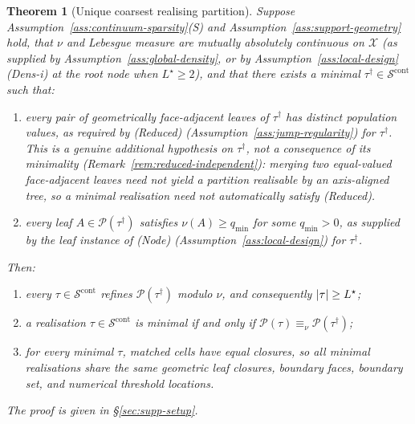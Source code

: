 \documentclass[11pt]{article}
\theoremstyle{plain}
\newtheorem{theorem}{Theorem}[section]
\theoremstyle{definition}
\theoremstyle{remark}
\newcommand{\cX}{\mathcal{X}}
\newcommand{\cS}{\mathcal{S}}
\newcommand{\cP}{\mathcal{P}}
\DeclarePairedDelimiter{\card}{\lvert}{\rvert}
\begin{document}
\begin{theorem}[Unique coarsest realising partition]\label{thm:true-partition}
Suppose Assumption~\ref{ass:continuum-sparsity}(S) and
Assumption~\ref{ass:support-geometry} hold, that \(\nu\) and Lebesgue
measure are mutually absolutely continuous on \(\cX\) (as supplied by
Assumption~\ref{ass:global-density}, or by
Assumption~\ref{ass:local-design}(Dens-i) at the root node when
\(L^\star\ge2\)), and that there exists a minimal
\(\tau^{\dagger}\in\cS^{\mathrm{cont}}\) such that:
\begin{enumerate}[leftmargin=*]
\item every pair of geometrically face-adjacent leaves of \(\tau^{\dagger}\)
has distinct population values, as required by (Reduced)
(Assumption~\ref{ass:jump-regularity}) for \(\tau^{\dagger}\). This is a
genuine additional hypothesis on \(\tau^{\dagger}\), not a consequence of
its minimality (Remark~\ref{rem:reduced-independent}): merging two
equal-valued face-adjacent leaves need not yield a partition realisable by
an axis-aligned tree, so a minimal realisation need not automatically
satisfy (Reduced).
\item every leaf \(A\in\cP(\tau^{\dagger})\) satisfies \(\nu(A)\ge q_{\min}\)
for some \(q_{\min}>0\), as supplied by the leaf instance of (Node)
(Assumption~\ref{ass:local-design}) for \(\tau^{\dagger}\).
\end{enumerate}
Then:
\begin{enumerate}[leftmargin=*]
\item every \(\tau\in\cS^{\mathrm{cont}}\) refines \(\cP(\tau^{\dagger})\)
modulo \(\nu\), and consequently \(\card\tau\ge L^\star\);
\item a realisation \(\tau\in\cS^{\mathrm{cont}}\) is minimal if and only if
\(\cP(\tau)\equiv_\nu\cP(\tau^{\dagger})\);
\item for every minimal \(\tau\), matched cells have equal closures, so all
minimal realisations share the same geometric leaf closures, boundary
faces, boundary set, and numerical threshold locations.
\end{enumerate}
The proof is given in \S\ref{sec:supp-setup}.
\end{theorem}
\end{document}
